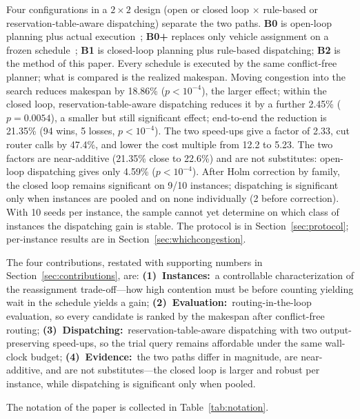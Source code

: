 \documentclass[manuscript,screen,review]{acmart}
\newcommand{\NCases}{10}
\newcommand{\NSeeds}{10}
\newcommand{\GainLoopRule}{18.86\%}      %
\newcommand{\PLoopRule}{<10^{-4}}
\newcommand{\GainProbeOpen}{4.59\%}      %
\newcommand{\PProbeOpen}{<10^{-4}}
\newcommand{\GainProbeLoop}{2.45\%}      %
\newcommand{\PProbeLoop}{=0.0054}
\newcommand{\GainEndToEnd}{21.35\%}      %
\newcommand{\PEndToEnd}{<10^{-4}}
\newcommand{\WinEndToEnd}{94}
\newcommand{\LoseEndToEnd}{5}
\newcommand{\GainIndepProduct}{22.6\%}
\newcommand{\CellsSigLoopAdj}{9}
\newcommand{\CellsSigProbe}{2}
\newcommand{\SpeedupProbe}{2.33}
\newcommand{\RouteCallCut}{47.4\%}
\newcommand{\CostMultBefore}{12.2}
\newcommand{\CostMultAfter}{5.23}
\begin{document}
Four configurations in a $2\times 2$ design (open or closed loop $\times$ rule-based or reservation-table-aware dispatching) separate the two paths.
\textbf{B0} is open-loop planning plus actual execution~\cite{li2026framework};
\textbf{B0+} replaces only vehicle assignment on a frozen schedule~\cite{sun2023integrated};
\textbf{B1} is closed-loop planning plus rule-based dispatching;
\textbf{B2} is the method of this paper.
Every schedule is executed by the same conflict-free planner; what is compared is the realized makespan.
Moving congestion into the search reduces makespan by \GainLoopRule{} ($p\PLoopRule$), the larger effect;
within the closed loop, reservation-table-aware dispatching reduces it by a further \GainProbeLoop{} ($p\PProbeLoop$), a smaller but still significant effect;
end-to-end the reduction is \GainEndToEnd{} (\WinEndToEnd{} wins, \LoseEndToEnd{} losses, $p\PEndToEnd$).
The two speed-ups give a factor of \SpeedupProbe{}, cut router calls by \RouteCallCut{}, and lower the cost multiple from \CostMultBefore{} to \CostMultAfter{}.
The two factors are near-additive (\GainEndToEnd{} close to \GainIndepProduct{}) and are not substitutes: open-loop dispatching gives only \GainProbeOpen{} ($p\PProbeOpen$).
After Holm correction by family, the closed loop remains significant on \CellsSigLoopAdj{}/\NCases{} instances; dispatching is significant only when instances are pooled and on none individually (\CellsSigProbe{} before correction).
With \NSeeds{} seeds per instance, the sample cannot yet determine on which class of instances the dispatching gain is stable.
The protocol is in Section~\ref{sec:protocol}; per-instance results are in Section~\ref{sec:whichcongestion}.

The four contributions, restated with supporting numbers in Section~\ref{sec:contributions}, are:
\textbf{(1)~Instances:}~a controllable characterization of the reassignment trade-off---how high contention must be before counting yielding wait in the schedule yields a gain;
\textbf{(2)~Evaluation:}~routing-in-the-loop evaluation, so every candidate is ranked by the makespan after conflict-free routing;
\textbf{(3)~Dispatching:}~reservation-table-aware dispatching with two output-preserving speed-ups, so the trial query remains affordable under the same wall-clock budget;
\textbf{(4)~Evidence:}~the two paths differ in magnitude, are near-additive, and are not substitutes---the closed loop is larger and robust per instance, while dispatching is significant only when pooled.

The notation of the paper is collected in Table~\ref{tab:notation}.
\end{document}
